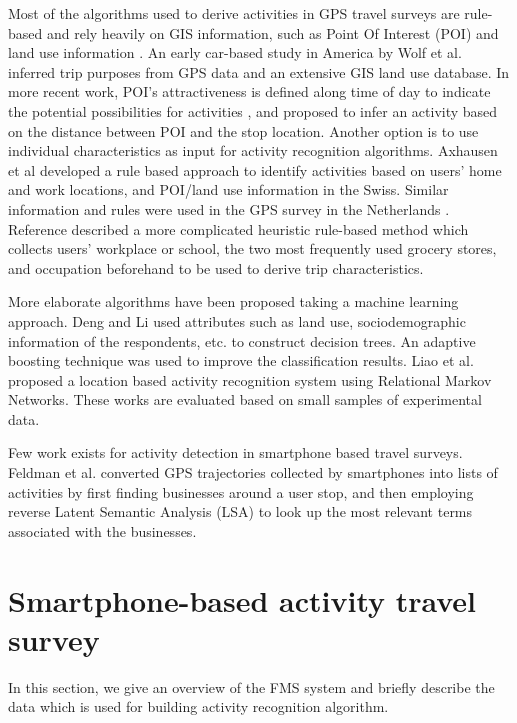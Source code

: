 \documentclass{sig-alternate}
\begin{document}
Most of the algorithms used to derive activities in GPS travel surveys are rule-based and rely heavily on GIS information, such as Point Of Interest (POI) and land use information \cite{Wolf2001, Huang2010Activitygps, Furletti2013InferringActivities}. An early car-based study in America by Wolf et al. \cite{Wolf2001} inferred trip purposes from GPS data and an extensive GIS land use database.  In more recent work, POI's attractiveness is defined along time of day to indicate the potential possibilities for activities \cite{Huang2010Activitygps}, and \cite{Furletti2013InferringActivities} proposed to infer an activity based on the distance between POI and the stop location. Another option is to use individual characteristics as input for activity recognition algorithms. Axhausen et al \cite{Axhausen2004} developed a rule based approach to identify activities based on users' home and work locations, and POI/land use information in the Swiss. Similar information and rules were used in the GPS survey in the Netherlands \cite{Bohte2009}. Reference \cite{Stopher2008} described a more complicated heuristic rule-based method which collects users' workplace or school, the two most frequently used grocery stores, and occupation beforehand to be used to derive trip characteristics.

More elaborate algorithms have been proposed taking a machine learning approach. Deng and Li \cite{Deng2010} used attributes such as land use, sociodemographic information of the respondents, etc. to construct decision trees. An adaptive boosting technique was used to improve the classification results. Liao et al. \cite{Liao2005Locationbased} proposed a location based activity recognition system using Relational Markov Networks. These works are evaluated based on small samples of experimental data.

Few work exists for activity detection in smartphone based travel surveys. Feldman et al. \cite{Feldman2013iDiary} converted GPS trajectories collected by smartphones into lists of activities by first finding businesses around a user stop, and then employing reverse Latent Semantic Analysis (LSA) to look up the most relevant terms associated with the businesses.





\section{Smartphone-based activity travel survey}
In this section, we give an overview of the FMS system and briefly describe the data which is used for building activity recognition algorithm.
\end{document}
